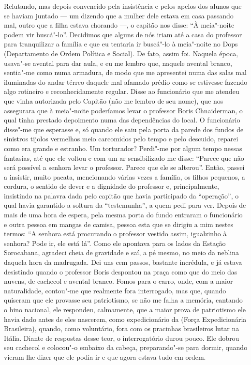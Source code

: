 Relutando, mas depois convencido pela insistência e pelos apelos dos
alunos que se haviam juntado --- um dizendo que a mulher dele estava em
casa passando mal, outro que a filha estava chorando ---, o capitão nos
disse: ``À meia"-noite podem vir buscá"-lo''. Decidimos que alguns de nós
iriam até a casa do professor para tranquilizar a família e que eu
tentaria ir buscá"-lo à meia"-noite no Dops (Departamento de Ordem
Política e Social). De fato, assim foi. Naquela época, usava"-se avental
para dar aula, e eu me lembro que, naquele avental branco, sentia"-me
como numa armadura, de modo que me apresentei numa das salas mal
iluminadas do andar térreo daquele mal afamado prédio como se estivesse
fazendo algo rotineiro e reconhecidamente regular. Disse ao funcionário
que me atendeu que vinha autorizada pelo Capitão  (não me lembro de seu
nome), que nos assegurara que à meia"-noite poderíamos levar o professor
Boris Chnaiderman, o qual tinha prestado depoimento numa das
dependências do local. O funcionário disse"-me que esperasse e, só quando
ele saiu pela porta da parede dos fundos de sinistros tijolos vermelhos
meio carcomidos pelo tempo e pelo descuido, reparei como era grande e
estranho. Um torturador? Perdi"-me por algum tempo nessas fantasias, até
que ele voltou e com um ar sensibilizado me disse: ``Parece que não será
possível a senhora levar o professor. Parece que ele se alterou''.
Então, passei a insistir, muito pacata, mencionando várias vezes a
família, os filhos pequenos, a cordura, o sentido de dever e a dignidade
do professor e, principalmente, insistindo na palavra dada pelo capitão
que havia participado da ``operação'', o qual havia garantido a soltura
da ``testemunha'', a quem pedi para ver. Depois de mais de uma hora de
espera, pela mesma porta do fundo entraram o funcionário e outra pessoa
em mangas de camisa, pessoa esta que se dirigiu a mim nestes termos: ``A
senhora está procurando o professor vestido assim, igualzinho à senhora?
Pode ir, ele está lá''. Como ele apontava para os lados da Estação
Sorocabana, agradeci cheia de gravidade e saí, a pé mesmo, no meio da
neblina daquela hora da madrugada. Dei uns cem passos, bastante
incrédula, e já estava desistindo quando o professor Boris despontou na
praça como que do meio das nuvens, de cachecol e avental branco. Fomos para
o carro, onde, com a maior naturalidade, contou"-me que realmente fora
interrogado, mas que, quando quiseram que ele provasse seu patriotismo,
se não me falha a memória, cantando o hino nacional, ele respondeu,
calmamente, que a maior prova de patriotismo ele havia dado antes de
eles nascerem, como expedicionário da  (Força Expedicionária
Brasileira), quando, como voluntário, fora com os pracinhas brasileiros
lutar na Itália. Diante de respostas desse teor, o interrogatório durou
pouco. Ele dobrou seu cachecol e colocou"-o embaixo da cabeça,
preparando"-se para dormir, quando vieram lhe dizer que ele podia ir e
que agora estava tudo em ordem.

